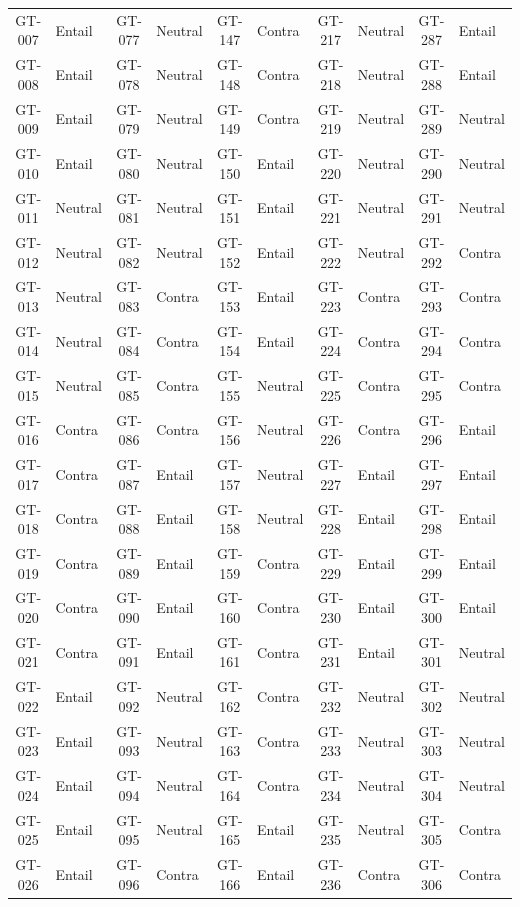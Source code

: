 \begin{longtable}{@{} c l @{\hspace{10pt}} c l @{\hspace{10pt}} c l @{\hspace{10pt}} c l @{\hspace{10pt}} c l @{}}
GT-007 & Entail & GT-077 & Neutral & GT-147 & Contra & GT-217 & Neutral & GT-287 & Entail \\
GT-008 & Entail & GT-078 & Neutral & GT-148 & Contra & GT-218 & Neutral & GT-288 & Entail \\
GT-009 & Entail & GT-079 & Neutral & GT-149 & Contra & GT-219 & Neutral & GT-289 & Neutral \\
GT-010 & Entail & GT-080 & Neutral & GT-150 & Entail & GT-220 & Neutral & GT-290 & Neutral \\
GT-011 & Neutral & GT-081 & Neutral & GT-151 & Entail & GT-221 & Neutral & GT-291 & Neutral \\
GT-012 & Neutral & GT-082 & Neutral & GT-152 & Entail & GT-222 & Neutral & GT-292 & Contra \\
GT-013 & Neutral & GT-083 & Contra & GT-153 & Entail & GT-223 & Contra & GT-293 & Contra \\
GT-014 & Neutral & GT-084 & Contra & GT-154 & Entail & GT-224 & Contra & GT-294 & Contra \\
GT-015 & Neutral & GT-085 & Contra & GT-155 & Neutral & GT-225 & Contra & GT-295 & Contra \\
GT-016 & Contra & GT-086 & Contra & GT-156 & Neutral & GT-226 & Contra & GT-296 & Entail \\
GT-017 & Contra & GT-087 & Entail & GT-157 & Neutral & GT-227 & Entail & GT-297 & Entail \\
GT-018 & Contra & GT-088 & Entail & GT-158 & Neutral & GT-228 & Entail & GT-298 & Entail \\
GT-019 & Contra & GT-089 & Entail & GT-159 & Contra & GT-229 & Entail & GT-299 & Entail \\
GT-020 & Contra & GT-090 & Entail & GT-160 & Contra & GT-230 & Entail & GT-300 & Entail \\
GT-021 & Contra & GT-091 & Entail & GT-161 & Contra & GT-231 & Entail & GT-301 & Neutral \\
GT-022 & Entail & GT-092 & Neutral & GT-162 & Contra & GT-232 & Neutral & GT-302 & Neutral \\
GT-023 & Entail & GT-093 & Neutral & GT-163 & Contra & GT-233 & Neutral & GT-303 & Neutral \\
GT-024 & Entail & GT-094 & Neutral & GT-164 & Contra & GT-234 & Neutral & GT-304 & Neutral \\
GT-025 & Entail & GT-095 & Neutral & GT-165 & Entail & GT-235 & Neutral & GT-305 & Contra \\
GT-026 & Entail & GT-096 & Contra & GT-166 & Entail & GT-236 & Contra & GT-306 & Contra \\

\end{longtable}
